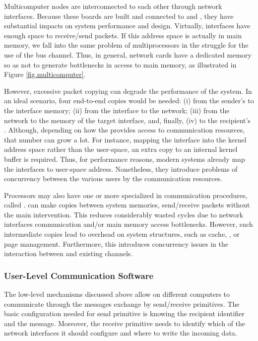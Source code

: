 				Multicomputer nodes are interconnected to each other through network interfaces.
				Because these boards are built and connected to \cpus and \ram,
				they have substantial impacts on system performance and \os design.
				Virtually, interfaces have enough \ram space to receive/send packets.
				If this address space is actually in main memory, we fall into the same
				problem of multiprocessors in the struggle for the use of the bus channel.
				Thus, in general, network cards have a dedicated memory so as not to
				generate bottlenecks in access to main memory, as illustrated in Figure \ref{fig.multicomputer}.

				However, excessive packet copying can degrade the performance of the system.
				In an ideal scenario, four end-to-end copies would be needed:
				(i) from the sender's \ram to the interface memory; (ii) from the interface
				to the network; (iii) from the network to the memory of the target interface, and,
				finally,  (iv) to the recipient's \ram.
				Although, depending on how the \os provides access to communication
				resources, that number can grow a lot.
				For instance, mapping the interface into the kernel address space
				rather than the user-space, an extra copy to an internal kernel
				buffer is required.
				Thus, for performance reasons, modern systems already map the interfaces
				to user-space address.
				Nonetheless, they introduce problems of concurrency between the various
				users by the communication resources.

				Processors may also have one or more \cpus specialized in
				communication procedures, called \dma.
				\dmas can make copies between system memories, send/receive packets
				without the main \cpus intervention. This reduces considerably wasted cycles due to 
				network interfaces communication and/or main memory access bottlenecks.
				However, such intermediate copies lead to overhead on system structures,
				such as cache, \tlb, or page management.
				Furthermore, this introduces concurrency issues in the interaction between
				\cpus and existing \dma channels.

			\subsubsection{User-Level Communication Software}
			\label{sec.multicomputers-user-sw}

				The low-level mechanisms discussed above allow \cpus on different
				computers to communicate through the messages exchange by
				send/receive primitives.
				The basic configuration needed for send primitive is knowing the
				recipient identifier and the message.
				Moreover, the receive primitive needs to identify which of
				the network interfaces it should configure and where to write the
				incoming data.

